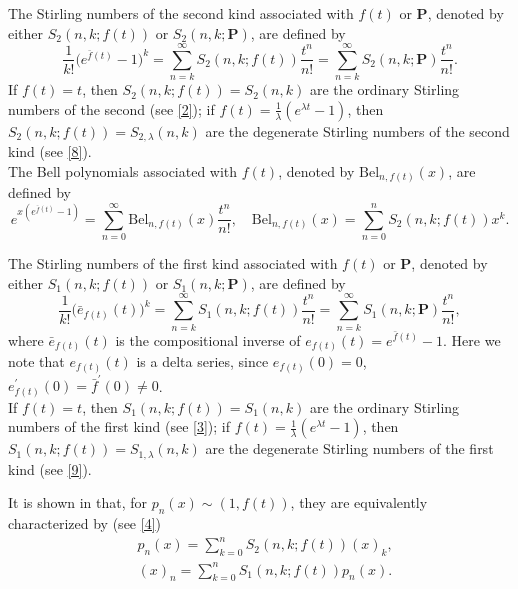 \documentclass[a4paper,11pt]{amsart}
\begin{document}
The Stirling numbers of the second kind associated with $f(t)$ or $\mathbf{P}$, denoted by either $S_{2}(n,k; f(t))$ or $S_{2}(n,k; \mathbf{P})$, are defined by
\begin{equation} \label{22}
\frac{1}{k!}\big(e^{\bar{f}(t)}-1\big)^{k}=\sum_{n=k}^{\infty}S_{2}(n,k; f(t))\frac{t^{n}}{n!}=\sum_{n=k}^{\infty}S_{2}(n,k; \mathbf{P})\frac{t^{n}}{n!}.
\end{equation}
If $f(t)=t$, then $S_{2}(n,k; f(t))=S_{2}(n,k)$ are the ordinary Stirling numbers of the second (see \eqref{2}); if $f(t)=\frac{1}{\lambda}(e^{\lambda t}-1)$, then $S_{2}(n,k; f(t))=S_{2,\lambda}(n,k)$ are the degenerate Stirling numbers of the second kind (see \eqref{8}). \\
The Bell polynomials associated with $f(t)$, denoted by $\mathrm{Bel}_{n,f(t)}(x)$, are defined by
\begin{equation*}
e^{x (e^{\bar{f}(t)}-1)}=\sum_{n=0}^{\infty}\mathrm{Bel}_{n, f(t)}(x)\frac{t^{n}}{n!}, \quad \mathrm{Bel}_{n, f(t)}(x)=\sum_{n=0}^{n}S_{2}(n,k; f(t))x^{k}.
\end{equation*} \par
The Stirling numbers of the first kind associated with $f(t)$ or $\mathbf{P}$, denoted by either $S_{1}(n,k; f(t))$ or $S_{1}(n,k; \mathbf{P})$, are defined by
\begin{equation} \label{23}
\frac{1}{k!}\big(\bar{e}_{f(t)}(t)\big)^{k}=\sum_{n=k}^{\infty}S_{1}(n,k; f(t))\frac{t^{n}}{n!}=\sum_{n=k}^{\infty}S_{1}(n,k; \mathbf{P})\frac{t^{n}}{n!},
\end{equation}
where $\bar{e}_{f(t)}(t)$ is the compositional inverse of $e_{f(t)}(t)=e^{\bar{f}(t)}-1$. Here we note that $e_{f(t)}(t)$ is a delta series, since $e_{f(t)}(0)=0$, $e_{f(t)}^{\prime}(0)=\bar{f}^{\prime}(0) \ne 0$. \\
If $f(t)=t$, then $S_{1}(n,k; f(t))=S_{1}(n,k)$ are the ordinary Stirling numbers of the first kind (see \eqref{3}); if $f(t)=\frac{1}{\lambda}(e^{\lambda t}-1)$, then $S_{1}(n,k; f(t))=S_{1,\lambda}(n,k)$ are the degenerate Stirling numbers of the first kind (see \eqref{9}). \par
It is shown in \cite{7} that, for $p_{n}(x) \sim (1, f(t))$, they are equivalently characterized by (see \eqref{4})\\
\begin{align}
&p_{n}(x)=\sum_{k=0}^{n}S_{2}(n,k; f(t))(x)_{k}, \label{24} \\
&(x)_{n}=\sum_{k=0}^{n}S_{1}(n,k; f(t))p_{n}(x). \label{25}
\end{align}
\end{document}
